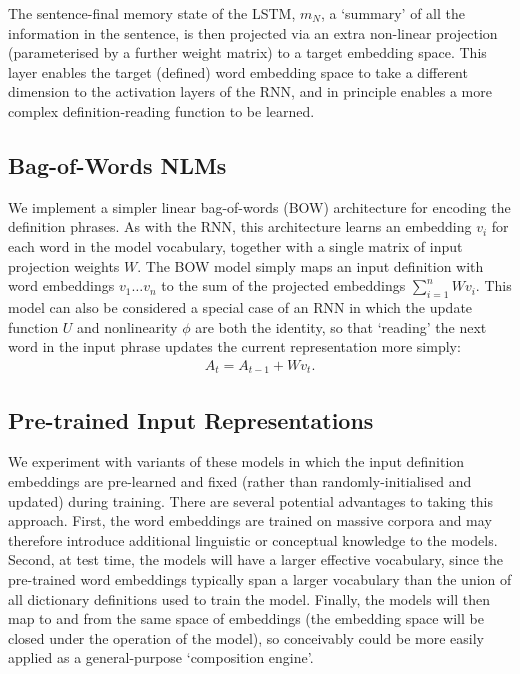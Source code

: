 \documentclass[11pt,letterpaper]{article}
\begin{document}
The sentence-final memory state of the LSTM, \(m_N\), a `summary' of all the
information in the sentence, is then projected via an extra non-linear
projection (parameterised by a further weight matrix) to a target embedding
space. This  layer enables the target (defined) word embedding space to take a
different dimension to the activation layers of the RNN, and in principle
enables a more complex definition-reading function to be learned. 

\subsection{Bag-of-Words NLMs}

We implement a simpler linear bag-of-words (BOW) architecture for encoding the
definition phrases. As with the RNN, this architecture learns an embedding
\(v_i\) for each word in the model vocabulary, together with a single matrix of
input projection weights \(W\). The BOW model simply maps an input definition
with word embeddings \(v_1 \dots v_n\) to the sum of the projected embeddings
\(\sum_{i=1}^n Wv_i \). This model can also be considered a special case of an
RNN in which the update function \(U\) and nonlinearity \(\phi\) are both the
identity, so that `reading' the next word in the input phrase updates the
current representation more simply:
\begin{align*}
A_t =  A_{t-1} + Wv_t.
\end{align*}

\subsection{Pre-trained Input Representations}

We experiment with variants of these models in which the input definition embeddings are pre-learned and fixed (rather than randomly-initialised and updated) during training. There are several potential advantages to taking this approach. First, the word embeddings are trained on massive corpora and may therefore introduce additional linguistic or conceptual knowledge to the models. Second, at test time, the models will have a larger effective vocabulary, since the pre-trained word embeddings typically span a larger vocabulary than the union of all dictionary definitions used to train the model. Finally, the models will then map to and from the same space of embeddings (the embedding space will be closed under the operation of the model), so conceivably could be more easily applied as a general-purpose `composition engine'.
\end{document}

